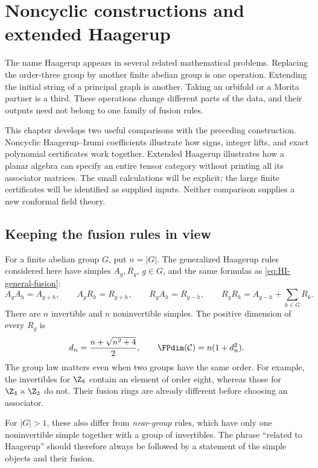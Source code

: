 \chapter{Noncyclic constructions and extended Haagerup}
\label{ch:related-categories}

The name Haagerup appears in several related mathematical problems.
Replacing the order-three group by another finite abelian group is one
operation. Extending the initial string of a principal graph is another.
Taking an orbifold or a Morita partner is a third. These operations
change different parts of the data, and their outputs need not belong
to one family of fusion rules.

This chapter develops two useful comparisons with the preceding
construction. Noncyclic Haagerup--Izumi coefficients illustrate how
signs, integer lifts, and exact polynomial certificates work together.
Extended Haagerup illustrates how a planar algebra can specify an
entire tensor category without printing all its associator matrices.
The small calculations will be explicit; the large finite certificates
will be identified as supplied inputs. Neither comparison supplies a
new conformal field theory.

\section{Keeping the fusion rules in view}

For a finite abelian group $G$, put $n=|G|$. The generalized
Haagerup rules considered here have simples $A_g,R_g$, $g\in G$,
and the same formulas as \eqref{eq:HI-general-fusion}:
\[
 A_gA_h=A_{g+h},\qquad A_gR_h=R_{g+h},\qquad
 R_gA_h=R_{g-h},\qquad
 R_gR_h=A_{g-h}+\sum_{k\in G}R_k.
\]
There are $n$ invertible and $n$ noninvertible simples. The positive
dimension of every $R_g$ is
\[
 d_n=\frac{n+\sqrt{n^2+4}}2,
 \qquad \FPdim(\mathcal C)=n(1+d_n^2).
\]
The group law matters even when two groups have the same order.
For example, the invertibles for $\Z_8$ contain an element of order
eight, whereas those for $\Z_4\times\Z_2$ do not. Their fusion rings
are already different before choosing an associator.

For $|G|>1$, these also differ from \emph{near-group} rules, which have
only one noninvertible simple together with a group of invertibles.
The phrase ``related to Haagerup'' should therefore always be followed
by a statement of the simple objects and their fusion.


